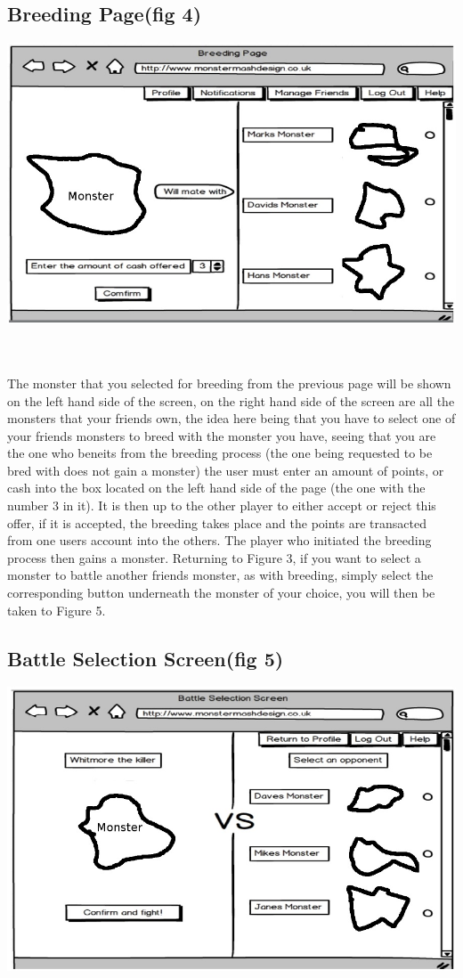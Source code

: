 \documentclass{project}
\begin{document}
\subsection{Breeding Page(fig 4)}
\includegraphics[scale=0.5]{breedingPage.jpg}

\\
\\
The monster that you selected for breeding from the previous page will be shown
on the left hand side of the screen, on the right hand side of the screen are all the
monsters that your friends own, the idea here being that you have to select one of
your friends monsters to breed with the monster you have, seeing that you are the
one who beneits from the breeding process (the one being requested to be bred with
does not gain a monster) the user must enter an amount of points, or cash into the
box located on the left hand side of the page (the one with the number 3 in it). It
is then up to the other player to either accept or reject this offer, if it is accepted,
the breeding takes place and the points are transacted from one users account into
the others. The player who initiated the breeding process then gains a monster.
Returning to Figure 3, if you want to select a monster to battle another friends
monster, as with breeding, simply select the corresponding button underneath the
monster of your choice, you will then be taken to Figure 5.
\newpage

\subsection{Battle Selection Screen(fig 5)}
\includegraphics[scale=0.5]{battleSelection.jpg}
\end{document}
